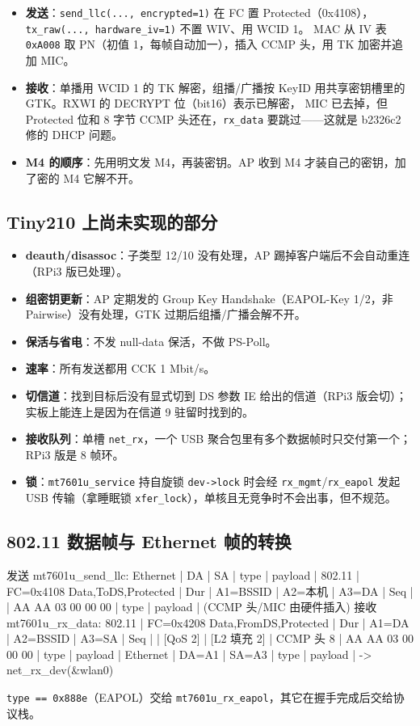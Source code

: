 \documentclass[UTF8,zihao=-4,fontset=none]{ctexart}
\newcommand{\fn}[1]{\texttt{#1}}
\begin{document}
\begin{itemize}[leftmargin=2em,itemsep=0pt]
\item \textbf{发送}：\fn{send\_llc(..., encrypted=1)} 在 FC 置 Protected（0x4108），\fn{tx\_raw(..., hardware\_iv=1)} 不置 WIV、用 WCID 1。
  MAC 从 IV 表 \fn{0xA008} 取 PN（初值 1，每帧自动加一），插入 CCMP 头，用 TK 加密并追加 MIC。
\item \textbf{接收}：单播用 WCID 1 的 TK 解密，组播/广播按 KeyID 用共享密钥槽里的 GTK。RXWI 的 DECRYPT 位（bit16）表示已解密，
  MIC 已去掉，但 Protected 位和 8 字节 CCMP 头还在，\fn{rx\_data} 要跳过——这就是 b2326c2 修的 DHCP 问题。
\item \textbf{M4 的顺序}：先用明文发 M4，再装密钥。AP 收到 M4 才装自己的密钥，加了密的 M4 它解不开。
\end{itemize}

\subsection{Tiny210 上尚未实现的部分}

\begin{itemize}[leftmargin=2em,itemsep=0pt]
\item \textbf{deauth/disassoc}：子类型 12/10 没有处理，AP 踢掉客户端后不会自动重连（RPi3 版已处理）。
\item \textbf{组密钥更新}：AP 定期发的 Group Key Handshake（EAPOL-Key 1/2，非 Pairwise）没有处理，GTK 过期后组播/广播会解不开。
\item \textbf{保活与省电}：不发 null-data 保活，不做 PS-Poll。
\item \textbf{速率}：所有发送都用 CCK 1 Mbit/s。
\item \textbf{切信道}：找到目标后没有显式切到 DS 参数 IE 给出的信道（RPi3 版会切）；实板上能连上是因为在信道 9 驻留时找到的。
\item \textbf{接收队列}：单槽 \fn{net\_rx}，一个 USB 聚合包里有多个数据帧时只交付第一个；RPi3 版是 8 帧环。
\item \textbf{锁}：\fn{mt7601u\_service} 持自旋锁 \fn{dev->lock} 时会经 \fn{rx\_mgmt}/\fn{rx\_eapol} 发起 USB 传输（拿睡眠锁 \fn{xfer\_lock}），单核且无竞争时不会出事，但不规范。
\end{itemize}

\subsection{802.11 数据帧与 Ethernet 帧的转换}

\begin{code}
发送 mt7601u_send_llc:
 Ethernet | DA | SA | type | payload |
 802.11   | FC=0x4108 Data,ToDS,Protected | Dur | A1=BSSID | A2=本机 | A3=DA | Seq |
          | AA AA 03 00 00 00 | type | payload |      (CCMP 头/MIC 由硬件插入)
接收 mt7601u_rx_data:
 802.11   | FC=0x4208 Data,FromDS,Protected | Dur | A1=DA | A2=BSSID | A3=SA | Seq |
          | [QoS 2] | [L2 填充 2] | CCMP 头 8 | AA AA 03 00 00 00 | type | payload |
 Ethernet | DA=A1 | SA=A3 | type | payload |  -> net_rx_dev(&wlan0)
\end{code}
\fn{type == 0x888e}（EAPOL）交给 \fn{mt7601u\_rx\_eapol}，其它在握手完成后交给协议栈。
\end{document}

